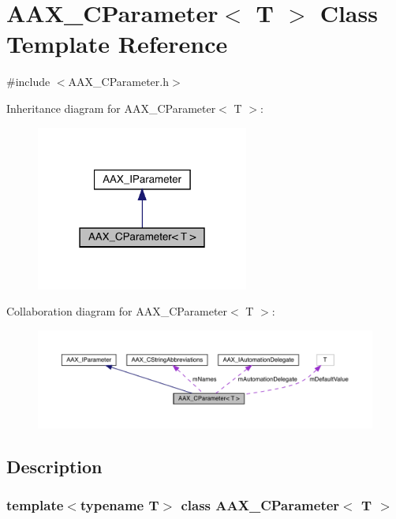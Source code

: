 \hypertarget{a01537}{}\section{A\+A\+X\+\_\+\+C\+Parameter$<$ T $>$ Class Template Reference}
\label{a01537}


{\ttfamily \#include $<$A\+A\+X\+\_\+\+C\+Parameter.\+h$>$}



Inheritance diagram for A\+A\+X\+\_\+\+C\+Parameter$<$ T $>$\+:
\nopagebreak
\begin{figure}[H]
\begin{center}
\leavevmode
\includegraphics[width=198pt]{a01536}
\end{center}
\end{figure}


Collaboration diagram for A\+A\+X\+\_\+\+C\+Parameter$<$ T $>$\+:
\nopagebreak
\begin{figure}[H]
\begin{center}
\leavevmode
\includegraphics[width=350pt]{a01535}
\end{center}
\end{figure}


\subsection{Description}
\subsubsection*{template$<$typename T$>$\newline
class A\+A\+X\+\_\+\+C\+Parameter$<$ T $>$}

